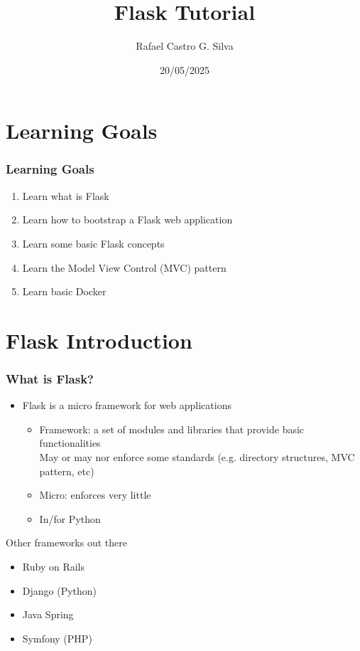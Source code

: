 \documentclass[fleqn,aspectratio=169,10pt]{beamer}
\title[Flask Tutorial]{Flask Tutorial}
\author[Rafael]{Rafael Castro G. Silva}
\date{20/05/2025}
\institute[UCPH]{
  Department of Computer Science \\
  University of Copenhagen}
\begin{document}

\begin{frame}
  \titlepage
\end{frame}

\section{Learning Goals}

\begin{frame}
  \frametitle{Learning Goals}
  \begin{enumerate}
    \item Learn what is Flask
    \item Learn how to bootstrap a Flask web application
    \item Learn some basic Flask concepts
    \item Learn the Model View Control (MVC) pattern
    \item Learn basic Docker
  \end{enumerate}
\end{frame}

\section{Flask Introduction}

\begin{frame}[fragile]
  \frametitle{What is Flask?}
  \begin{itemize}
          \pause
    \item Flask is a micro framework for web applications
          \pause
          \begin{itemize}
            \item Framework: a set of modules and libraries that provide basic functionalities \\
                  May or may nor enforce some standards (e.g. directory structures, MVC pattern, etc)
            \item Micro: enforces very little
            \item In/for Python
          \end{itemize}
  \end{itemize}
  \pause
  \begin{block}{Other frameworks out there}
    \begin{itemize}
      \item Ruby on Rails
      \item Django (Python)
      \item Java Spring
      \item Symfony (PHP)
    \end{itemize}
  \end{block}
\end{frame}
\end{document}
